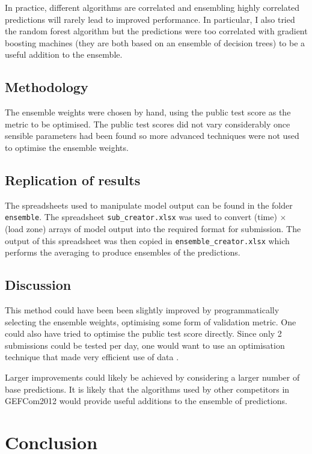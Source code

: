 \documentclass[preprint,authoryear,12pt]{elsarticle}
\begin{document}
In practice, different algorithms are correlated and ensembling highly correlated predictions will rarely lead to improved performance.
In particular, I also tried the random forest algorithm but the predictions were too correlated with gradient boosting machines (they are both based on an ensemble of decision trees) to be a useful addition to the ensemble.

\subsection{Methodology}

The ensemble weights were chosen by hand, using the public test score as the metric to be optimised.
The public test scores did not vary considerably once sensible parameters had been found so more advanced techniques were not used to optimise the ensemble weights.

\subsection{Replication of results}

The spreadsheets used to manipulate model output can be found in the folder \texttt{ensemble}.
The spreadsheet \texttt{sub\_creator.xlsx} was used to convert (time) $\times$ (load zone) arrays of model output into the required format for submission.
The output of this spreadsheet was then copied in \texttt{ensemble\_creator.xlsx} which performs the averaging to produce ensembles of the predictions.

\subsection{Discussion}

This method could have been been slightly improved by programmatically selecting the ensemble weights, optimising some form of validation metric.
One could also have tried to optimise the public test score directly.
Since only 2 submissions could be tested per day, one would want to use an optimisation technique that made very efficient use of data \citep[e.g.][]{Osborne2009, snoek2012practical}.

Larger improvements could likely be achieved by considering a larger number of base predictions.
It is likely that the algorithms used by other competitors in GEFCom2012 would provide useful additions to the ensemble of predictions.

\section{Conclusion}
\end{document}
